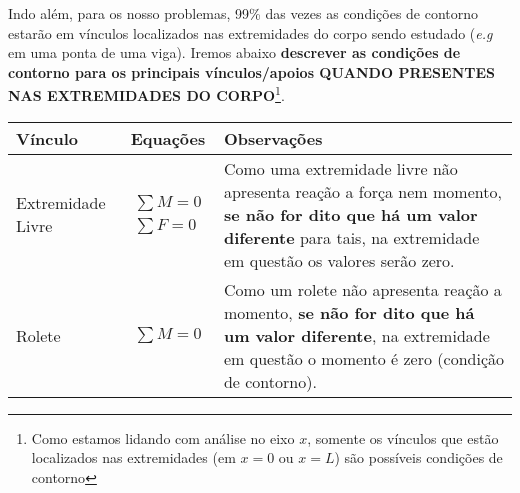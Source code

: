 \documentclass{article}
\begin{document}
            Indo além, para os nosso problemas, 99\% das vezes as condições de contorno estarão em vínculos localizados nas extremidades do corpo sendo estudado (\emph{e.g} em uma ponta de uma viga). Iremos abaixo
            \textbf{descrever as condições de contorno para os principais vínculos/apoios QUANDO PRESENTES NAS EXTREMIDADES DO CORPO}\footnote{Como estamos lidando com análise no eixo $x$, somente
            os vínculos que estão localizados nas extremidades (em $x=0$ ou $x=L$) são possíveis condições de contorno}.

            \begin{table}[h]
                \centering
                \begin{tabular}{|l|c|l|}\hline
                    \textbf{Vínculo} & \textbf{Equações} & \textbf{Observações} \\ \hline
                    Extremidade Livre  & 
                        \begin{minipage}{.4\textwidth}
                            \begin{align*}
                                \sum M = 0 \\ 
                                \sum F = 0
                            \end{align*}
                        \end{minipage} &
                        
                        \begin{minipage}{.4\textwidth}
                            \vspace{5px}
                            Como uma extremidade livre não apresenta reação a força nem momento, \textbf{se não for dito que há um valor diferente} para tais, na extremidade em questão os valores serão zero.
                        \end{minipage} \\ \hline

                    Rolete & 
                        \begin{minipage}{.4\textwidth}
                            \begin{align*}
                                \sum M = 0
                            \end{align*}
                        \end{minipage} &
                        
                        \begin{minipage}{.4\textwidth}
                            \vspace{5px}
                            Como um rolete não apresenta reação a momento, \textbf{se não for dito que há um valor diferente}, na extremidade em questão  o momento é zero (condição de contorno).
                        \end{minipage} \\ \hline                       


\end{tabular}
\end{table}
\end{document}
